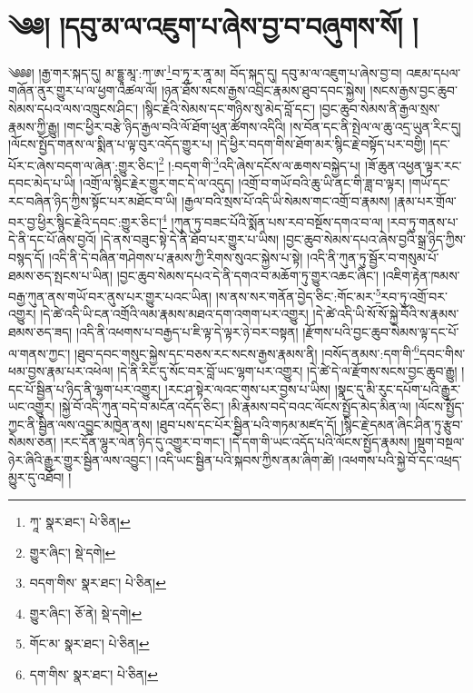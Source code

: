 \setcounter{footnote}{0} 
\chapter{༄༅། །དབུ་མ་ལ་འཇུག་པ་ཞེས་བྱ་བ་བཞུགས་སོ། །}༄༅༅། །རྒྱ་གར་སྐད་དུ། མ་དྷྱཱ་མཱ་:ཀ་ཨ་\footnote{ཀཱ་  སྣར་ཐང་།  པེ་ཅིན། }བ་ཏཱ་ར་ནཱ་མ། བོད་སྐད་དུ། དབུ་མ་ལ་འཇུག་པ་ཞེས་བྱ་བ། འཇམ་དཔལ་གཞོན་ནུར་གྱུར་པ་ལ་ཕྱག་འཚལ་ལོ། །ཉན་ཐོས་སངས་རྒྱས་འབྲིང་རྣམས་ཐུབ་དབང་སྐྱེས། །སངས་རྒྱས་བྱང་ཆུབ་སེམས་དཔའ་ལས་འཁྲུངས་ཤིང་། །སྙིང་རྗེའི་སེམས་དང་གཉིས་སུ་མེད་བློ་དང་། །བྱང་ཆུབ་སེམས་ནི་རྒྱལ་སྲས་རྣམས་ཀྱི་རྒྱུ། །གང་ཕྱིར་བརྩེ་ཉིད་རྒྱལ་བའི་ལོ་ཐོག་ཕུན་ཚོགས་འདིའི། །ས་བོན་དང་ནི་སྤེལ་ལ་ཆུ་འདྲ་ཡུན་རིང་དུ། །ལོངས་སྤྱོད་གནས་ལ་སྨིན་པ་ལྟ་བུར་འདོད་གྱུར་པ། །དེ་ཕྱིར་བདག་གིས་ཐོག་མར་སྙིང་རྗེ་བསྟོད་པར་བགྱི། །དང་པོར་ང་ཞེས་བདག་ལ་ཞེན་:གྱུར་ཅིང་།\footnote{གྱུར་ཞིང་།  སྡེ་དགེ། } །:བདག་གི་\footnote{བདག་གིས་  སྣར་ཐང་།  པེ་ཅིན། }འདི་ཞེས་དངོས་ལ་ཆགས་བསྐྱེད་པ། །ཟོ་ཆུན་འཕྱན་ལྟར་རང་དབང་མེད་པ་ཡི། །འགྲོ་ལ་སྙིང་རྗེར་གྱུར་གང་དེ་ལ་འདུད། །འགྲོ་བ་གཡོ་བའི་ཆུ་ཡི་ནང་གི་ཟླ་བ་ལྟར། །གཡོ་དང་རང་བཞིན་ཉིད་ཀྱིས་སྟོང་པར་མཐོང་བ་ཡི། །རྒྱལ་བའི་སྲས་པོ་འདི་ཡི་སེམས་གང་འགྲོ་བ་རྣམས། །རྣམ་པར་གྲོལ་བར་བྱ་ཕྱིར་སྙིང་རྗེའི་དབང་:གྱུར་ཅིང་།\footnote{གྱུར་ཞིང་།  ཅོ་ནེ།  སྡེ་དགེ། } །ཀུན་ཏུ་བཟང་པོའི་སྨོན་པས་རབ་བསྔོས་དགའ་བ་ལ། །རབ་ཏུ་གནས་པ་དེ་ནི་དང་པོ་ཞེས་བྱའོ། །དེ་ནས་བཟུང་སྟེ་དེ་ནི་ཐོབ་པར་གྱུར་པ་ཡིས། །བྱང་ཆུབ་སེམས་དཔའ་ཞེས་བྱའི་སྒྲ་ཉིད་ཀྱིས་བསྙད་དོ། །འདི་ནི་དེ་བཞིན་གཤེགས་པ་རྣམས་ཀྱི་རིགས་སུའང་སྐྱེས་པ་སྟེ། །འདི་ནི་ཀུན་ཏུ་སྦྱོར་བ་གསུམ་པོ་ཐམས་ཅད་སྤངས་པ་ཡིན། །བྱང་ཆུབ་སེམས་དཔའ་དེ་ནི་དགའ་བ་མཆོག་ཏུ་གྱུར་འཆང་ཞིང་། །འཇིག་རྟེན་ཁམས་བརྒྱ་ཀུན་ནས་གཡོ་བར་ནུས་པར་གྱུར་པའང་ཡིན། །ས་ནས་སར་གནོན་བྱེད་ཅིང་:གོང་མར་\footnote{གོང་མ་  སྣར་ཐང་།  པེ་ཅིན། }རབ་ཏུ་འགྲོ་བར་འགྱུར། །དེ་ཚེ་འདི་ཡི་ངན་འགྲོའི་ལམ་རྣམས་མཐའ་དག་འགག་པར་འགྱུར། །དེ་ཚེ་འདི་ཡི་སོ་སོ་སྐྱེ་བོའི་ས་རྣམས་ཐམས་ཅད་ཟད། །འདི་ནི་འཕགས་པ་བརྒྱད་པ་ཇི་ལྟ་དེ་ལྟར་ཉེ་བར་བསྟན། །རྫོགས་པའི་བྱང་ཆུབ་སེམས་ལྟ་དང་པོ་ལ་གནས་ཀྱང་། །ཐུབ་དབང་གསུང་སྐྱེས་དང་བཅས་རང་སངས་རྒྱས་རྣམས་ནི། །བསོད་ནམས་:དག་གི་\footnote{དག་གིས་  སྣར་ཐང་།  པེ་ཅིན། }དབང་གིས་ཕམ་བྱས་རྣམ་པར་འཕེལ། །དེ་ནི་རིང་དུ་སོང་བར་བློ་ཡང་ལྷག་པར་འགྱུར། །དེ་ཚེ་དེ་ལ་རྫོགས་སངས་བྱང་ཆུབ་རྒྱུ། །དང་པོ་སྦྱིན་པ་ཉིད་ནི་ལྷག་པར་འགྱུར། །རང་ཤ་སྟེར་ལའང་གུས་པར་བྱས་པ་ཡིས། །སྣང་དུ་མི་རུང་དཔོག་པའི་རྒྱུར་ཡང་འགྱུར། །སྐྱེ་བོ་འདི་ཀུན་བདེ་བ་མངོན་འདོད་ཅིང་། །མི་རྣམས་བདེ་བའང་ལོངས་སྤྱོད་མེད་མིན་ལ། །ལོངས་སྤྱོད་ཀྱང་ནི་སྦྱིན་ལས་འབྱུང་མཁྱེན་ནས། །ཐུབ་པས་དང་པོར་སྦྱིན་པའི་གཏམ་མཛད་དོ། །སྙིང་རྗེ་དམན་ཞིང་ཤིན་ཏུ་རྩུབ་སེམས་ཅན། །རང་དོན་ལྷུར་ལེན་ཉིད་དུ་འགྱུར་བ་གང་། །དེ་དག་གི་ཡང་འདོད་པའི་ལོངས་སྤྱོད་རྣམས། །སྡུག་བསྔལ་ཉེར་ཞིའི་རྒྱུར་གྱུར་སྦྱིན་ལས་འབྱུང་། །འདི་ཡང་སྦྱིན་པའི་སྐབས་ཀྱིས་ནམ་ཞིག་ཚེ། །འཕགས་པའི་སྐྱེ་བོ་དང་འཕྲད་མྱུར་དུ་འཐོབ། །
